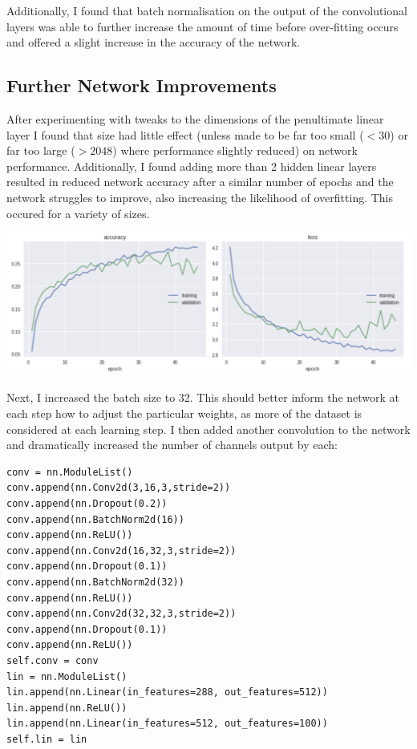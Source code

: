 \documentclass[11pt]{article}
\begin{document}
Additionally, I found that batch normalisation on the output of the convolutional layers was able to further increase the amount of time before over-fitting occurs and offered a slight increase in the accuracy of the network.

\subsection{Further Network Improvements}


After experimenting with tweaks to the dimensions of the penultimate linear layer I found that size had little effect (unless made to be far too small ($<30$) or far too large ($>2048$) where performance slightly reduced) on network performance. Additionally, I found adding more than 2 hidden linear layers resulted in reduced network accuracy after a similar number of epochs and the network struggles to improve, also increasing the likelihood of overfitting. This occured for a variety of sizes.

    \begin{center}
        \begin{minipage}{0.75\linewidth}
            \includegraphics[width=\linewidth]{accuracy6}
        \end{minipage}%
    \end{center}
    
Next, I increased the batch size to 32. This should better inform the network at each step how to adjust the particular weights, as more of the dataset is considered at each learning step. I then added another convolution to the network and dramatically increased the number of channels output by each:

\begin{small}
\begin{verbatim}
conv = nn.ModuleList()
conv.append(nn.Conv2d(3,16,3,stride=2))
conv.append(nn.Dropout(0.2))
conv.append(nn.BatchNorm2d(16))
conv.append(nn.ReLU())
conv.append(nn.Conv2d(16,32,3,stride=2))
conv.append(nn.Dropout(0.1))
conv.append(nn.BatchNorm2d(32))
conv.append(nn.ReLU())
conv.append(nn.Conv2d(32,32,3,stride=2))
conv.append(nn.Dropout(0.1))
conv.append(nn.ReLU())
self.conv = conv
lin = nn.ModuleList()
lin.append(nn.Linear(in_features=288, out_features=512))
lin.append(nn.ReLU())
lin.append(nn.Linear(in_features=512, out_features=100))
self.lin = lin
\end{verbatim}
\end{small}
\end{document}
